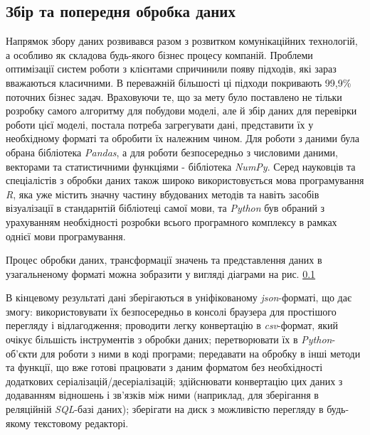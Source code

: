 \subsection{Збір та попередня обробка даних}
Напрямок збору даних розвивався разом з розвитком комунікаційних технологій, а особливо як складова будь-якого бізнес процесу компаній. Проблеми оптимізації систем роботи з клієнтами спричинили появу підходів, які зараз вважаються класичними. В переважній більшості ці підходи покривають 99,9\% поточних бізнес задач. Враховуючи те, що за мету було поставлено не тільки розробку самого алгоритму для побудови моделі, але й збір даних для перевірки роботи цієї моделі, постала потреба загрегувати дані, представити їх у необхідному форматі та обробити їх належним чином. Для роботи з даними була обрана бібліотека \textit{Pandas}, а для роботи безпосередньо з числовими даними, векторами та статистичними функціями - бібліотека \textit{NumPy}. Серед науковців та спеціалістів з обробки даних також широко використовується мова програмування \textit{R}, яка уже містить значну частину вбудованих методів та навіть засобів візуалізації в стандарнтій бібліотеці самої мови, та \textit{Python} був обраний з урахуванням необхідності розробки всього програмного комплексу в рамках однієї мови програмування.

Процес обробки даних, трансформації значень та представлення даних в узагальненому форматі можна зобразити у вигляді діаграми на рис. \ref{}

В кінцевому результаті дані зберігаються в уніфікованому \textit{json}-форматі, що дає змогу: використовувати їх безпосередньо в консолі браузера для простішого перегляду і відлагодження; проводити легку конвертацію в \textit{csv}-формат, який очікує більшість інструментів з обробки даних; перетворювати їх в \textit{Python}-об'єкти для роботи з ними в коді програми; передавати на обробку в інші методи та функції, що вже готові працювати з даним форматом без необхідності додаткових серіалізацій/десеріалізацій; здійснювати конвертацію цих даних з додаванням відношень і зв'язків між ними (наприклад, для зберігання в реляційній \textit{SQL}-базі даних); зберігати на диск з можливістю перегляду в будь-якому текстовому редакторі.


